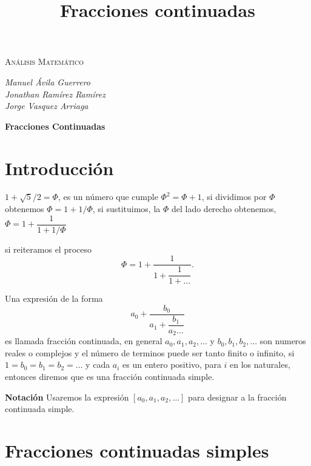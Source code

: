 \documentclass[11pt, article]{article}
\title{Fracciones continuadas}
\author{}
\date{}
\begin{document}
    \begin{center}
    {\scshape\LARGE Análisis Matemático \par}

    \vspace{0.5cm}
    \large{\itshape{Manuel Ávila Guerrero}}  \\ 
    \large{\itshape{Jonathan Ramírez Ramírez}}  \\
    \large{\itshape{Jorge Vasquez Arriaga}} \\

    {\LARGE \textbf{Fracciones Continuadas} \par}
    \end{center}


\section*{Introducción}
    $1 + \sqrt{5}/2=\Phi$, es un número que cumple $\Phi^2=\Phi + 1$, si dividimos por $\Phi$ obtenemos $\Phi=1+1/\Phi$, si sustituimos, la $\Phi$ del lado derecho obtenemos,  $\Phi = 1 + \dfrac{1}{1 + 1 /\Phi}$

    si reiteramos el proceso 
    \[
    \Phi=1+\dfrac{1}{1+\dfrac{1}{1+\dots}}.
    \]
    
    Una expresión de la forma 
    \[
    a_0 + \dfrac{b_0}{a_1+ \dfrac{b_1}{a_2\dots}} 
    \]
    es llamada fracción continuada, en general $a_0, a_1,a_2,...$ y $b_0, b_1,b_2,...$ son numeros reales o complejos y el número de terminos puede ser tanto finito o infinito, si $1=b_0=b_1=b_2=...$ y cada $a_i$ es un entero positivo, para $i$ en los naturales, entonces diremos que es una fracción continuada simple.
    
    \textbf{Notación} Usaremos la expresión $[a_0,a_1,a_2, \dots]$ para designar a la fracción continuada simple.
    
\section*{Fracciones continuadas simples}
    
\end{document}
